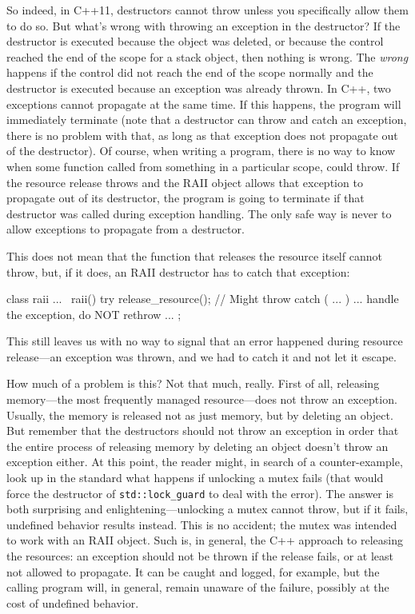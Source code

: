 So indeed, in C++11, destructors cannot throw unless you specifically allow them to do so. But what's wrong with throwing an exception in the destructor? If the destructor is executed because the object was deleted, or because the control reached the end of the scope for a stack object, then nothing is wrong. The \emph{wrong} happens if the control did not reach the end of the scope normally and the destructor is executed because an exception was already thrown. In C++, two exceptions cannot propagate at the same time. If this happens, the program will immediately terminate (note that a destructor can throw and catch an exception, there is no problem with that, as long as that exception does not propagate out of the destructor). Of course, when writing a program, there is no way to know when some function called from something in a particular scope, could throw. If the resource release throws and the RAII object allows that exception to propagate out of its destructor, the program is going to terminate if that destructor was called during exception handling. The only safe way is never to allow exceptions to propagate from a destructor.

This does not mean that the function that releases the resource itself cannot throw, but, if it does, an RAII destructor has to catch that exception:

\begin{code}
class raii {
  ...
  ~raii() {
    try {
      release_resource();    // Might throw
    } catch ( ... ) {
      ... handle the exception, do NOT rethrow ...
    }
  }
};
\end{code}

This still leaves us with no way to signal that an error happened during resource release---an exception was thrown, and we had to catch it and not let it escape.

How much of a problem is this? Not that much, really. First of all, releasing memory---the most frequently managed resource---does not throw an exception. Usually, the memory is released not as just memory, but by deleting an object. But remember that the destructors should not throw an exception in order that the entire process of releasing memory by deleting an object doesn't throw an exception either. At this point, the reader might, in search of a counter-example, look up in the standard what happens if unlocking a mutex fails (that would force the destructor of \texttt{std::lock\_guard} to deal with the error). The answer is both surprising and enlightening---unlocking a mutex cannot throw, but if it fails, undefined behavior results instead. This is no accident; the mutex was intended to work with an RAII object. Such is, in general, the C++ approach to releasing the resources: an exception should not be thrown if the release fails, or at least not allowed to propagate. It can be caught and logged, for example, but the calling program will, in general, remain unaware of the failure, possibly at the cost of undefined behavior.

